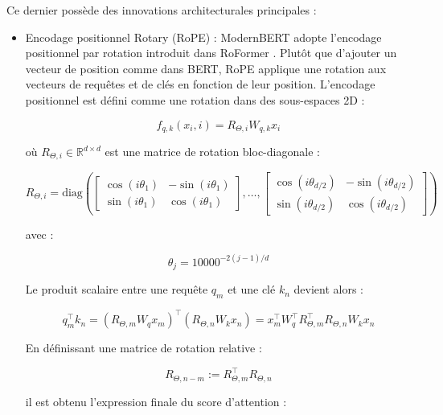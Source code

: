 Ce dernier possède des innovations architecturales principales :
\begin{itemize}
 \item Encodage positionnel Rotary (RoPE) : ModernBERT adopte l'encodage positionnel par rotation introduit dans RoFormer \citep{su2021roformer}. Plutôt que d'ajouter un vecteur de position comme dans BERT, RoPE applique une rotation aux vecteurs de requêtes et de clés en fonction de leur position. L'encodage positionnel est défini comme une rotation dans des sous-espaces 2D :

\begin{equation}
    f_{q,k}(x_i, i) = R_{\Theta, i} W_{q,k} x_i
\end{equation}

où $R_{\Theta, i} \in \mathbb{R}^{d \times d}$ est une matrice de rotation bloc-diagonale :

\begin{equation}
    R_{\Theta, i} = \text{diag}\left(
    \begin{bmatrix}
    \cos(i\theta_1) & -\sin(i\theta_1) \\
    \sin(i\theta_1) & \cos(i\theta_1)
    \end{bmatrix},
    \dots,
    \begin{bmatrix}
    \cos(i\theta_{d/2}) & -\sin(i\theta_{d/2}) \\
    \sin(i\theta_{d/2}) & \cos(i\theta_{d/2})
    \end{bmatrix}
    \right)
\end{equation}

avec :

\begin{equation}
    \theta_j = 10000^{-2(j-1)/d}
\end{equation}

Le produit scalaire entre une requête $q_m$ et une clé $k_n$ devient alors :

\begin{equation}
    q_m^\top k_n = (R_{\Theta,m} W_q x_m)^\top (R_{\Theta,n} W_k x_n)
    = x_m^\top W_q^\top R_{\Theta,m}^\top R_{\Theta,n} W_k x_n
\end{equation}

En définissant une matrice de rotation relative :

\begin{equation}
    R_{\Theta,n-m} := R_{\Theta,m}^\top R_{\Theta,n}
\end{equation}

il est obtenu l'expression finale du score d'attention :


\end{itemize}
